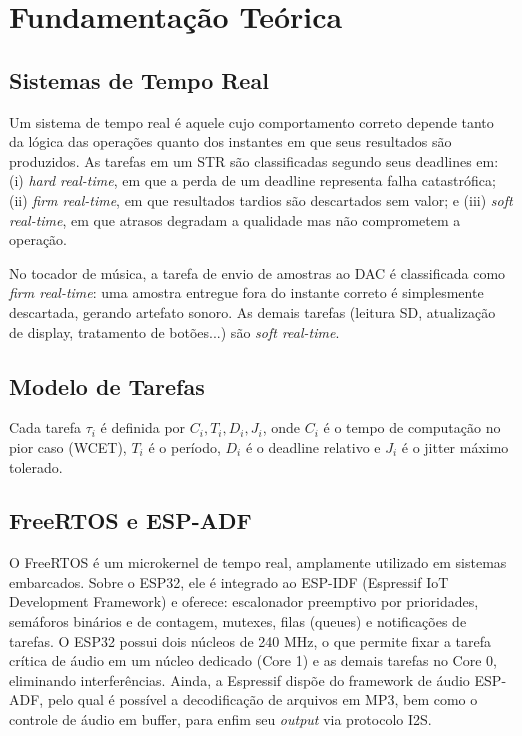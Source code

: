 \documentclass[conference]{IEEEtran}
\begin{document}
\section{Fundamentação Teórica}

\subsection{Sistemas de Tempo Real}

Um sistema de tempo real é aquele cujo comportamento correto depende tanto
da lógica das operações quanto dos instantes em que seus resultados são
produzidos. As tarefas em um STR são classificadas segundo
seus deadlines em: (i) \textit{hard real-time}, em que a perda de um deadline
representa falha catastrófica; (ii) \textit{firm real-time}, em que resultados
tardios são descartados sem valor; e (iii) \textit{soft real-time}, em que
atrasos degradam a qualidade mas não comprometem a operação.

No tocador de música, a tarefa de envio de amostras ao DAC é classificada como
\textit{firm real-time}: uma amostra entregue fora do instante correto é
simplesmente descartada, gerando artefato sonoro. As demais tarefas (leitura SD,
atualização de display, tratamento de botões...) são \textit{soft real-time}.

\subsection{Modelo de Tarefas}

Cada tarefa $\tau_i$ é definida por
$C_i, T_i, D_i, J_i$, onde $C_i$ é o tempo de computação no pior caso
(WCET), $T_i$ é o período, $D_i$ é o deadline relativo e $J_i$ é o jitter máximo tolerado.

\subsection{FreeRTOS e ESP-ADF}

O FreeRTOS é um microkernel de tempo real, amplamente
utilizado em sistemas embarcados. Sobre o ESP32, ele é
integrado ao ESP-IDF (Espressif IoT Development Framework) e oferece:
escalonador preemptivo por prioridades, semáforos binários e de contagem,
mutexes, filas (queues) e notificações de tarefas. O ESP32 possui dois núcleos
de 240 MHz, o que permite fixar a tarefa crítica de áudio em um núcleo
dedicado (Core 1) e as demais tarefas no Core 0, eliminando interferências. Ainda, a Espressif dispõe do framework de áudio ESP-ADF, pelo qual é possível a decodificação de arquivos em MP3, bem como o controle de áudio em buffer, para enfim seu \textit{output} via protocolo I2S.
\end{document}
